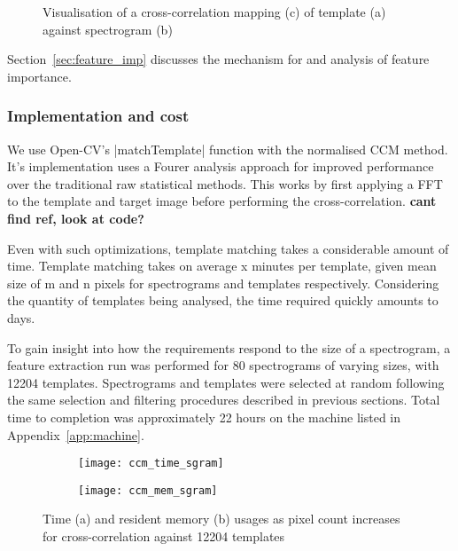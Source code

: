 \begin{figure}[t!]
  \centering
  \begin{subfigure}[t]{0.5\textwidth}
    \centering
    \caption{}
  \end{subfigure}
  \begin{subfigure}[t]{0.5\textwidth}
    \centering
    \caption{}
  \end{subfigure}
  \begin{subfigure}[t]{0.5\textwidth}
    \centering
    \caption{}
  \end{subfigure}
  \caption{Visualisation of a cross-correlation mapping (c) of template (a) against
  spectrogram (b)}
  \label{fig:ccm}
\end{figure}

Section~\ref{sec:feature_imp} discusses the mechanism for and analysis of feature
importance.

\subsubsection{Implementation and cost}
We use Open-CV's |matchTemplate| function with the normalised CCM method.
It's implementation uses a Fourer analysis approach for improved performance over
the traditional raw statistical methods.
This works by first applying a FFT to the template and target image before
performing the cross-correlation.
\textbf{cant find ref, look at code?}

Even with such optimizations, template matching takes a considerable amount of
time.
Template matching takes on average x minutes per template, given
mean size of m and n pixels for spectrograms and templates respectively.
Considering the quantity of templates being analysed, the time required quickly
amounts to days.

To gain insight into how the requirements respond to the size of a
spectrogram, a feature extraction run was performed for 80 spectrograms of
varying sizes, with 12204 templates.
Spectrograms and templates were selected at random following the same selection
and filtering procedures described in previous sections.
Total time to completion was approximately 22 hours on the machine listed in
Appendix~\ref{app:machine}.\\

\begin{figure}[h!]
  \centering
  \begin{subfigure}[t]{0.5\textwidth}
    \centering
    \texttt{[image: ccm\_time\_sgram]}
    \caption{}
  \end{subfigure}%
  \begin{subfigure}[t]{0.5\textwidth}
    \centering
    \texttt{[image: ccm\_mem\_sgram]}
    \caption{}
  \end{subfigure}
  \caption{Time (a) and resident memory (b) usages as pixel count increases for
  cross-correlation against 12204 templates}
\end{figure}

